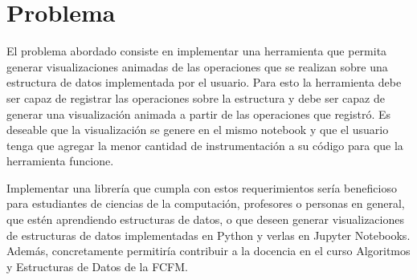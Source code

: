 \chapter{Problema}


El problema abordado consiste en implementar una herramienta que permita generar visualizaciones animadas de las operaciones que se realizan sobre una estructura de datos implementada por el usuario. Para esto la herramienta debe ser capaz de registrar las operaciones sobre la estructura y debe ser capaz de generar una visualización animada a partir de las operaciones que registró. Es deseable que la visualización se genere en el mismo notebook y que el usuario tenga que agregar la menor cantidad de instrumentación a su código para que la herramienta funcione.

Implementar una librería que cumpla con estos requerimientos sería beneficioso para estudiantes de ciencias de la computación, profesores o personas en general, que estén aprendiendo estructuras de datos, o que deseen generar visualizaciones de estructuras de datos implementadas en Python y verlas en Jupyter Notebooks. Además, concretamente permitiría contribuir a la docencia en el curso Algoritmos y Estructuras de Datos de la FCFM.

